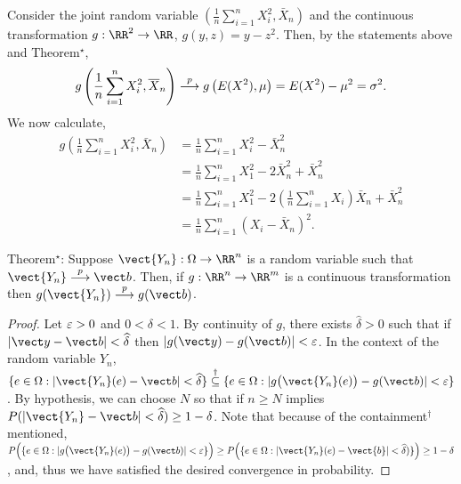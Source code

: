 \documentclass{stat_homework}
\begin{document}
\begin{solution}
  Consider the joint random variable $\left(\frac 1n \sum_{i=1}^n X_i^2, \bar X_n \right)$ and the continuous transformation $g:\RR^2 \to \RR$, $g(y,z) = y - z^2$.  Then, by the statements above and Theorem$^\star$,
  $$
  g\left(\frac 1n \sum_{i=1}^n X_i^2, \overline X_n \right) \stackrel{p}\longrightarrow g\left(E(X^2), \mu\right) = E(X^2) - \mu^2 = \sigma^2.
  $$
  We now calculate,
  \begin{align*}
    g\left(\frac 1n \sum_{i=1}^n X_i^2, \bar X_n \right)
    &=\frac 1n\sum_{i=1}^n X_i^2 - \bar X_n^2\\
    &=\frac 1n\sum_{i=1}^n X_1^2 - 2\bar X_n^2 + \bar X_n^2\\
    &=\frac 1n\sum_{i=1}^n X_1^2 - 2 \left(\frac 1n \sum_{i=1}^n X_i \right)\bar X_n + \bar X_n^2\\
    &=\frac 1n \sum_{i=1}^n(X_i-\bar X_n)^2.
  \end{align*}
\end{solution}

Theorem$^\star$: Suppose $\vect{Y_n}:\Omega \to \RR^n$ is a random variable such that $\vect{Y_n}\toprob\vect b$.  Then, if $g:\RR^n\to\RR^m$ is a continuous transformation then $g(\vect{Y_n}) \toprob g(\vect b)$.
\begin{proof}
  Let $\varepsilon>0$ and $0<\delta<1$.  By continuity of $g$, there exists $\hat \delta >0$ such that if $|\vect y - \vect b| < \hat\delta$ then $|g(\vect y) - g(\vect b)| <\eps$.  In the context of the random variable $Y_n$, $\{e\in\Omega:|\vect{Y_n}(e) - \vect b| < \hat\delta\} \stackrel{\dagger}\subseteq \{e\in\Omega:|g\big(\vect{Y_n}(e)\big) - g(\vect b)|<\eps\}$.  By hypothesis, we can choose $N$ so that if $n\ge N$ implies $  P( |\vect{Y_n} - \vect b| < \hat\delta)\ge 1-\delta$. Note that because of the containment$^\dagger$ mentioned, $P\Big(\{e\in\Omega:|g\big(\vect{Y_n}(e)\big) - g(\vect b)|<\eps\}\Big) \ge P\Big( \{e\in\Omega:|\vect{Y_n}(e) - \vect{b}|< \hat\delta)\}\Big) \ge 1-\delta$, and, thus we have satisfied the desired convergence in probability. 
\end{proof}
\newpage


\end{document}
